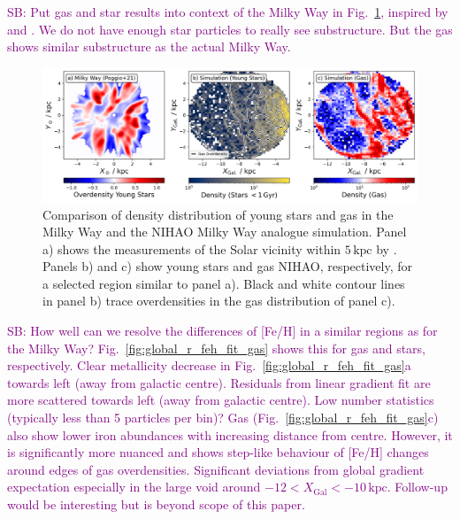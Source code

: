 \documentclass[fleqn,usenatbib]{mnras}
\newcommand{\SB}[1]{{\textcolor{purple}{SB: #1}}}
\begin{document}
\SB{Put gas and star results into context of the Milky Way in Fig.~\ref{fig:overdensities_mw_vs_nihao}, inspired by \citet{Poggio2021} and \citet{Hackshaw2024}. We do not have enough star particles to really see substructure. But the gas shows similar substructure as the actual Milky Way.}

\begin{figure}
    \centering
    \includegraphics[width=\textwidth]{figures/overdensities_mw_vs_nihao.png}
    \caption{Comparison of density distribution of young stars and gas in the Milky Way and the NIHAO Milky Way analogue simulation. Panel a) shows the measurements of the Solar vicinity within $5\,\mathrm{kpc}$ by \citet{Poggio2021}. Panels b) and c) show young stars and gas NIHAO, respectively, for a selected region similar to panel a). Black and white contour lines in panel b) trace overdensities in the gas distribution of panel c).}
    \label{fig:overdensities_mw_vs_nihao}
\end{figure}

\SB{How well can we resolve the differences of [Fe/H] in a similar regions as for the Milky Way? Fig.~\ref{fig:global_r_feh_fit_gas} shows this for gas and stars, respectively. Clear metallicity decrease in Fig.~\ref{fig:global_r_feh_fit_gas}a towards left (away from galactic centre). Residuals from linear gradient fit are more scattered towards left (away from galactic centre). Low number statistics (typically less than 5 particles per bin)? Gas (Fig.~\ref{fig:global_r_feh_fit_gas}c) also show lower iron abundances with increasing distance from centre. However, it is significantly more nuanced and shows step-like behaviour of [Fe/H] changes around edges of gas overdensities. Significant deviations from global gradient expectation especially in the large void around $-12 < X_\mathrm{Gal} < -10\,\mathrm{kpc}$. Follow-up would be interesting but is beyond scope of this paper.}
\end{document}
